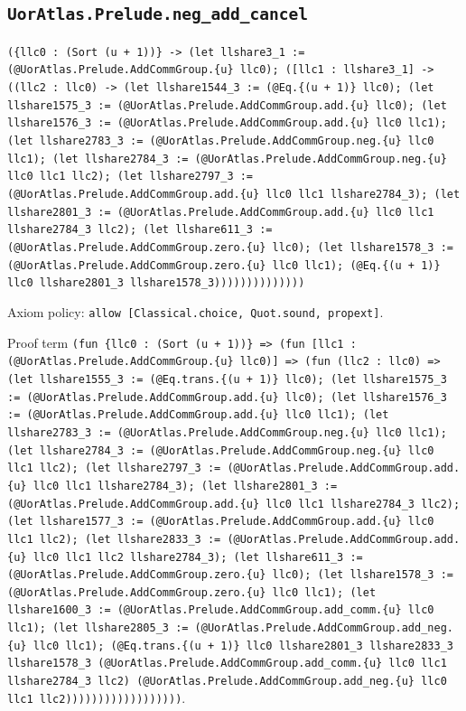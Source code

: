 \documentclass[11pt]{article}
\begin{document}
\subsection*{\texttt{UorAtlas.Prelude.neg\_add\_cancel}}
\noindent\texttt{(\{llc0 : (Sort (u + 1))\} -> (let llshare3\_1 := (@UorAtlas.Prelude.AddCommGroup.\{u\} llc0); ([llc1 : llshare3\_1] -> ((llc2 : llc0) -> (let llshare1544\_3 := (@Eq.\{(u + 1)\} llc0); (let llshare1575\_3 := (@UorAtlas.Prelude.AddCommGroup.add.\{u\} llc0); (let llshare1576\_3 := (@UorAtlas.Prelude.AddCommGroup.add.\{u\} llc0 llc1); (let llshare2783\_3 := (@UorAtlas.Prelude.AddCommGroup.neg.\{u\} llc0 llc1); (let llshare2784\_3 := (@UorAtlas.Prelude.AddCommGroup.neg.\{u\} llc0 llc1 llc2); (let llshare2797\_3 := (@UorAtlas.Prelude.AddCommGroup.add.\{u\} llc0 llc1 llshare2784\_3); (let llshare2801\_3 := (@UorAtlas.Prelude.AddCommGroup.add.\{u\} llc0 llc1 llshare2784\_3 llc2); (let llshare611\_3 := (@UorAtlas.Prelude.AddCommGroup.zero.\{u\} llc0); (let llshare1578\_3 := (@UorAtlas.Prelude.AddCommGroup.zero.\{u\} llc0 llc1); (@Eq.\{(u + 1)\} llc0 llshare2801\_3 llshare1578\_3))))))))))))))}\par
\noindent Axiom policy: \texttt{allow [Classical.choice, Quot.sound, propext]}.\par
\noindent Proof term \texttt{(fun \{llc0 : (Sort (u + 1))\} => (fun [llc1 : (@UorAtlas.Prelude.AddCommGroup.\{u\} llc0)] => (fun (llc2 : llc0) => (let llshare1555\_3 := (@Eq.trans.\{(u + 1)\} llc0); (let llshare1575\_3 := (@UorAtlas.Prelude.AddCommGroup.add.\{u\} llc0); (let llshare1576\_3 := (@UorAtlas.Prelude.AddCommGroup.add.\{u\} llc0 llc1); (let llshare2783\_3 := (@UorAtlas.Prelude.AddCommGroup.neg.\{u\} llc0 llc1); (let llshare2784\_3 := (@UorAtlas.Prelude.AddCommGroup.neg.\{u\} llc0 llc1 llc2); (let llshare2797\_3 := (@UorAtlas.Prelude.AddCommGroup.add.\{u\} llc0 llc1 llshare2784\_3); (let llshare2801\_3 := (@UorAtlas.Prelude.AddCommGroup.add.\{u\} llc0 llc1 llshare2784\_3 llc2); (let llshare1577\_3 := (@UorAtlas.Prelude.AddCommGroup.add.\{u\} llc0 llc1 llc2); (let llshare2833\_3 := (@UorAtlas.Prelude.AddCommGroup.add.\{u\} llc0 llc1 llc2 llshare2784\_3); (let llshare611\_3 := (@UorAtlas.Prelude.AddCommGroup.zero.\{u\} llc0); (let llshare1578\_3 := (@UorAtlas.Prelude.AddCommGroup.zero.\{u\} llc0 llc1); (let llshare1600\_3 := (@UorAtlas.Prelude.AddCommGroup.add\_comm.\{u\} llc0 llc1); (let llshare2805\_3 := (@UorAtlas.Prelude.AddCommGroup.add\_neg.\{u\} llc0 llc1); (@Eq.trans.\{(u + 1)\} llc0 llshare2801\_3 llshare2833\_3 llshare1578\_3 (@UorAtlas.Prelude.AddCommGroup.add\_comm.\{u\} llc0 llc1 llshare2784\_3 llc2) (@UorAtlas.Prelude.AddCommGroup.add\_neg.\{u\} llc0 llc1 llc2))))))))))))))))))}.\par
\end{document}
